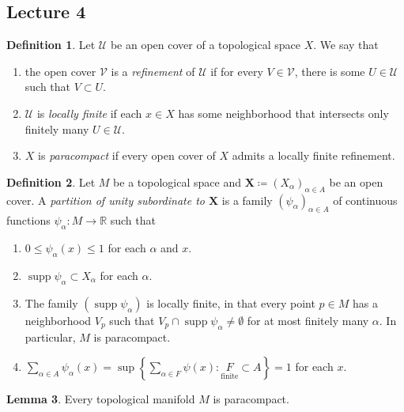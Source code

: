 \documentclass[10pt,letterpaper,cm]{nupset}
\theoremstyle{definition}
\newtheorem{definition}{Definition}[subsection]
\theoremstyle{theorem}
\newtheorem{lemma}[definition]{Lemma}
\theoremstyle{remark}
\newcommand{\R}{\mathbb R}
\newcommand{\X}{\mathbf X}
\newcommand{\1}{\mathbf{1}}
\newcommand{\0}{\vec 0}
\DeclareMathOperator{\supp}{supp}
\begin{document}
\subsection{Lecture 4}

\begin{definition}
Let $\mathcal{U}$ be an open cover of a topological space $X$. We say that 
\begin{enumerate}
\item the open cover $\mathcal{V}$ is a \textit{refinement} of $\mathcal{U}$ if for every $V\in \mathcal{V}$, there is some $U \in \mathcal{U}$ such that $V \subset U$.
\item $\mathcal{U}$ is \textit{locally finite} if each $x\in X$ has some neighborhood that intersects only finitely many $U \in \mathcal{U}$. 
\item $X$ is \textit{paracompact} if every open cover of $X$ admits a locally finite refinement.
\end{enumerate}
\end{definition}

\begin{definition} Let $M$ be a topological space and $\X\coloneqq (X_\alpha)_{\alpha \in A}$ be an open cover. A \textit{partition of unity subordinate to $\X$} is a family $(\psi_\alpha)_{\alpha \in A}$ of continuous functions $\psi_\alpha : M \to \R$ such that
\begin{enumerate}
\item $0\leq \psi_\alpha(x) \leq 1$ for each $\alpha$ and $x$.
\item $\supp \psi_\alpha \subset X_\alpha$ for each $\alpha$.
\item The family $(\supp \psi_\alpha)$ is locally finite, in that every point $p\in M$ has a neighborhood $V_p$ such that $V_p \cap \supp \psi_\alpha \ne \emptyset$ for at most finitely many $\alpha$. In particular, $M$ is paracompact.
\item $\sum_{\alpha \in A} \psi_\alpha(x) = \sup\left\{\sum_{\alpha \in F}\psi(x) : \underset{\text{finite}} F \subset A\right\} = 1$ for each $x$.
\end{enumerate}
\end{definition}

\begin{lemma}
Every topological manifold $M$ is paracompact. 
\end{lemma}
\end{document}
